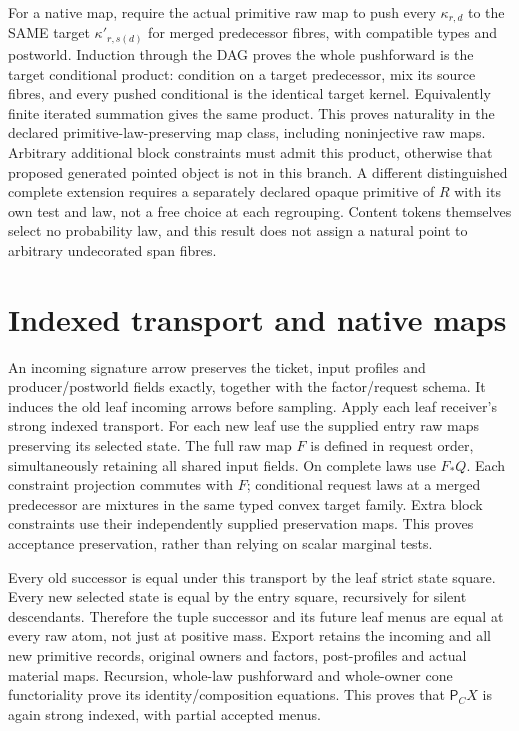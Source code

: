 \documentclass[11pt]{article}
\begin{document}
For a native map, require the actual primitive raw map to push every $\kappa_{r,d}$ to the SAME target $\kappa'_{r,s(d)}$ for merged predecessor fibres, with compatible types and postworld. Induction through the DAG proves the whole pushforward is the target conditional product: condition on a target predecessor, mix its source fibres, and every pushed conditional is the identical target kernel. Equivalently finite iterated summation gives the same product. This proves naturality in the declared primitive-law-preserving map class, including noninjective raw maps. Arbitrary additional block constraints must admit this product, otherwise that proposed generated pointed object is not in this branch. A different distinguished complete extension requires a separately declared opaque primitive of $R$ with its own test and law, not a free choice at each regrouping. Content tokens themselves select no probability law, and this result does not assign a natural point to arbitrary undecorated span fibres.

\section{Indexed transport and native maps}
An incoming signature arrow preserves the ticket, input profiles and producer/postworld fields exactly, together with the factor/request schema. It induces the old leaf incoming arrows before sampling. Apply each leaf receiver's strong indexed transport. For each new leaf use the supplied entry raw maps preserving its selected state. The full raw map $F$ is defined in request order, simultaneously retaining all shared input fields. On complete laws use $F_*Q$. Each constraint projection commutes with $F$; conditional request laws at a merged predecessor are mixtures in the same typed convex target family. Extra block constraints use their independently supplied preservation maps. This proves acceptance preservation, rather than relying on scalar marginal tests.

Every old successor is equal under this transport by the leaf strict state square. Every new selected state is equal by the entry square, recursively for silent descendants. Therefore the tuple successor and its future leaf menus are equal at every raw atom, not just at positive mass. Export retains the incoming and all new primitive records, original owners and factors, post-profiles and actual material maps. Recursion, whole-law pushforward and whole-owner cone functoriality prove its identity/composition equations. This proves that $\mathsf P_CX$ is again strong indexed, with partial accepted menus.
\end{document}
